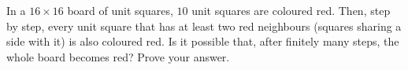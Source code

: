 In a $16\times16$ board of unit squares, $10$ unit squares are coloured red. Then, step by step, every unit square that has at least two red neighbours (squares sharing a side with it) is also coloured red. Is it possible that, after finitely many steps, the whole board becomes red? Prove your answer.
